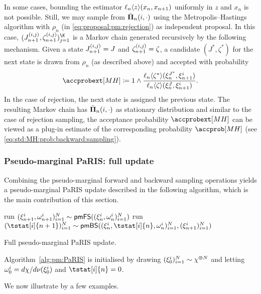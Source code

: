 In some cases, bounding the estimator $\ell_{n} \langle z \rangle(x_n, x_{n + 1})$ uniformly in $z$ and $x_n$ is not possible. Still, we may sample from $\bar{\boldsymbol{\Pi}}_{n}(i, \cdot)$ using the Metropolis--Hastings algorithm with $\rho_n$ (in \eqref{eq:proposal:pm:rejection}) as independent proposal. In this case, $(\bi{n + 1}{i}{j}, \zpart{n + 1}{(i, j)})_{j = 1}^{\K}$ is a Markov chain generated recursively by the following mechanism. Given a state $J_{n + 1}^{(i, j)} = J$ and $\zeta_{n + 1}^{(i, j)} = \zeta$, a candidate $(J^\ast, \zeta^\ast)$ for the next state is drawn from $\rho_n$ (as described above) and accepted with probability 
$$
\accprobext[MH] \eqdef 1 \wedge \frac{\ukest{n}{\zeta^\ast}(\epart{n}{J^\ast}, \epart{n + 1}{i})}{\ukest{n}{\zeta}(\epart{n}{J}, \epart{n + 1}{i})}. 
$$  
In the case of rejection, the next state is assigned the previous state. The resulting Markov chain has $\bar{\boldsymbol{\Pi}}_{n}(i, \cdot)$ as stationary distribution and similar to the case of rejection sampling, the acceptance probability $\accprobext[MH]$ can be viewed as a plug-in estimate of the corresponding probability $\accprob[MH]$ (see \eqref{eq:std:MH:prob:backward:sampling}). 

\subsubsection{Pseudo-marginal PaRIS: full update} 

Combining the pseudo-marginal forward and backward sampling operations yields a pseudo-marginal PaRIS update described in the following algorithm, which is the main contribution of this section.  

\begin{algorithm}[h] 
    run $(\xi_{n + 1}^{i}, \omega_{n + 1}^{i})_{i = 1}^N \sim \mathsf{pmFS}((\xi_{n}^{i}, \omega_{n}^{i})_{i = 1}^N)$\;
    run $(\tstat[i]{n + 1})_{i = 1}^\N \sim \mathsf{pmBS}((\epart{n}{i}, \tstat[i]{n}, \ewght{n}{i})_{i = 1}^\N, (\epart{n + 1}{i})_{i = 1}^\N)$\; 
    \medskip
\caption{Full pseudo-marginal PaRIS update.} \label{alg:pm:PaRIS}
\end{algorithm}

Algorithm~\ref{alg:pm:PaRIS} is initialised by drawing $(\xi_{0}^{i})_{i = 1}^N \sim \chi^{\varotimes N}$ and letting $\omega_{0}^{i} = d \chi / d \nu(\xi_{0}^{i})$ and $\tstat[i]{n} = 0$.

We now illustrate  by a few examples. 

